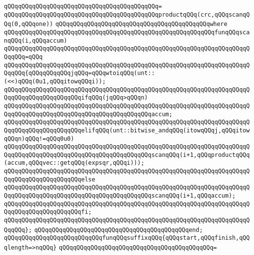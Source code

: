 \verb|qQQqqQQqqQQqqQQqqQQqqQQqqQQqqQQqqQQqqQQqqQQq=|\newline
\verb|qQQqqQQqqQQqqQQqqQQqqQQqqQQqqQQqqQQqqQQqqQQqproductqQQq(crc,qQQqscanqQQq(0,qQQqone))|\newline
\verb|qQQqqQQqqQQqqQQqqQQqqQQqqQQqqQQqqQQqqQQqqQQqwhere|\newline
\verb|qQQqqQQqqQQqqQQqqQQqqQQqqQQqqQQqqQQqqQQqqQQqqQQqqQQqqQQqqQQqfunqQQqscanqQQq(i,qQQqaccum)|\newline
\verb|qQQqqQQqqQQqqQQqqQQqqQQqqQQqqQQqqQQqqQQqqQQqqQQqqQQqqQQqqQQqqQQqqQQqqQQqqQQq=qQQq|\newline
\verb|qQQqqQQqqQQqqQQqqQQqqQQqqQQqqQQqqQQqqQQqqQQqqQQqqQQqqQQqqQQqqQQqqQQqqQQqqQQq{qQQqqQQqqQQqjqQQq=qQQqwtoiqQQq(unt::(<<)qQQq(0u1,qQQqitowqQQqi));|\newline
\newline
\verb|qQQqqQQqqQQqqQQqqQQqqQQqqQQqqQQqqQQqqQQqqQQqqQQqqQQqqQQqqQQqqQQqqQQqqQQqqQQqqQQqqQQqqQQqqQQqifqQQq(jqQQq>qQQqn)|\newline
\verb|qQQqqQQqqQQqqQQqqQQqqQQqqQQqqQQqqQQqqQQqqQQqqQQqqQQqqQQqqQQqqQQqqQQqqQQqqQQqqQQqqQQqqQQqqQQqqQQqqQQqqQQqqQQqqQQqaccum;|\newline
\verb|qQQqqQQqqQQqqQQqqQQqqQQqqQQqqQQqqQQqqQQqqQQqqQQqqQQqqQQqqQQqqQQqqQQqqQQqqQQqqQQqqQQqqQQqqQQqelifqQQq(unt::bitwise_andqQQq(itowqQQqj,qQQqitowqQQqn)qQQq!=qQQq0u0)|\newline
\verb|qQQqqQQqqQQqqQQqqQQqqQQqqQQqqQQqqQQqqQQqqQQqqQQqqQQqqQQqqQQqqQQqqQQqqQQqqQQqqQQqqQQqqQQqqQQqqQQqqQQqqQQqqQQqqQQqscanqQQq(i+1,qQQqproductqQQq(accum,qQQqvec::getqQQq(expsqr,qQQqi)));|\newline
\verb|qQQqqQQqqQQqqQQqqQQqqQQqqQQqqQQqqQQqqQQqqQQqqQQqqQQqqQQqqQQqqQQqqQQqqQQqqQQqqQQqqQQqqQQqqQQqelse|\newline
\verb|qQQqqQQqqQQqqQQqqQQqqQQqqQQqqQQqqQQqqQQqqQQqqQQqqQQqqQQqqQQqqQQqqQQqqQQqqQQqqQQqqQQqqQQqqQQqqQQqqQQqqQQqqQQqqQQqscanqQQq(i+1,qQQqaccum);|\newline
\verb|qQQqqQQqqQQqqQQqqQQqqQQqqQQqqQQqqQQqqQQqqQQqqQQqqQQqqQQqqQQqqQQqqQQqqQQqqQQqqQQqqQQqqQQqqQQqfi;|\newline
\verb|qQQqqQQqqQQqqQQqqQQqqQQqqQQqqQQqqQQqqQQqqQQqqQQqqQQqqQQqqQQqqQQqqQQqqQQqqQQq};|\newline
\verb|qQQqqQQqqQQqqQQqqQQqqQQqqQQqqQQqqQQqqQQqqQQqend;|\newline
\newline
\verb|qQQqqQQqqQQqqQQqqQQqqQQqqQQqfunqQQqsuffixqQQq{qQQqstart,qQQqfinish,qQQqlength=>nqQQq}|\newline
\verb|qQQqqQQqqQQqqQQqqQQqqQQqqQQqqQQqqQQqqQQqqQQq=|\newline
